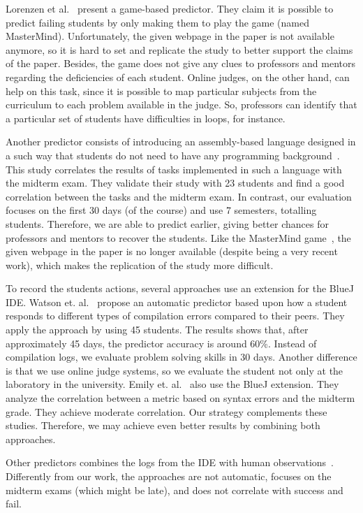 Lorenzen et al.~\cite{lorenzenC06-mastermind-predictor-sigcse2008} present a game-based predictor. They claim it is possible to predict failing students by only making them to play the game (named MasterMind). Unfortunately, the given webpage in the paper is not available anymore, so it is hard to set and replicate the study to better support the claims of the paper. Besides, the game does not give any clues to professors and mentors regarding the deficiencies of each student. Online judges, on the other hand, can help on this task, since it is possible to map particular subjects from the curriculum to each problem available in the judge. So, professors can identify that a particular set of students have difficulties in loops, for instance.

Another predictor consists of introducing an assembly-based language designed in a such way that students do not need to have any programming background~\cite{harris-assembly-jcsc2014}. This study correlates the results of tasks implemented in such a language with the midterm exam. They validate their study with 23 students and find a good correlation between the tasks and the midterm exam. In contrast, our evaluation focuses on the first 30 days (\semesterPercentage of the course) and use 7 semesters, totalling \totalStudents students. Therefore, we are able to predict earlier, giving better chances for professors and mentors to recover the students. Like the MasterMind game~\cite{lorenzenC06-mastermind-predictor-sigcse2008}, the given webpage in the paper is no longer available (despite being a very recent work), which makes the replication of the study more difficult.

To record the students actions, several approaches use an extension for the BlueJ IDE. Watson et. al.~\cite{watson-icalt-2013} propose an automatic predictor based upon how a student responds to different types of compilation errors compared to their peers. They apply the approach by using 45 students. The results shows that, after approximately 45 days, the predictor accuracy is around 60\%. Instead of compilation logs, we evaluate problem solving skills in 30 days. Another difference is that we use online judge systems, so we evaluate the student not only at the laboratory in the university.  Emily et. al.~\cite{emily-up-2008, emily-icer-2011} also use the BlueJ extension. They analyze the correlation between a metric based on syntax errors and the midterm grade. They achieve moderate correlation. Our strategy complements these studies. Therefore, we may achieve even better results by combining both approaches.

Other predictors combines the logs from the IDE with human observations~\cite{diane-acii-2011, rodrigo-behavioral-ITiCSE2009}. Differently from our work, the approaches are not automatic, focuses on the midterm exams (which might be late), and does not correlate with success and fail.


